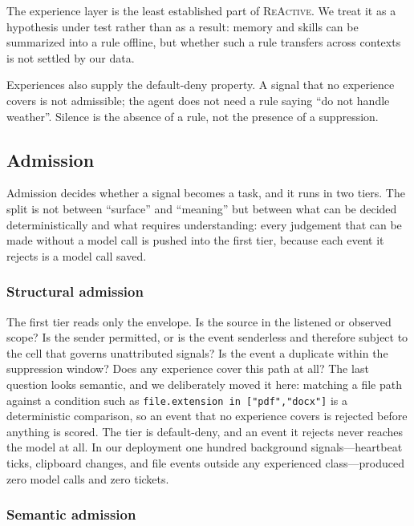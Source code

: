 \documentclass[10pt,a4paper]{article}
\newcommand{\sys}{\textsc{ReActive}}
\begin{document}
The experience layer is the least established part of \sys{}. We treat it as a hypothesis under test rather than as a result: memory and skills can be summarized into a rule offline, but whether such a rule transfers across contexts is not settled by our data.

Experiences also supply the default-deny property. A signal that no
experience covers is not admissible; the agent does not need a rule saying
``do not handle weather''. Silence is the absence of a rule, not the
presence of a suppression.

\subsection{Admission}

Admission decides whether a signal becomes a task, and it runs in two tiers. The split is not between ``surface'' and ``meaning'' but between what can be decided deterministically and what requires understanding: every judgement that can be made without a model call is pushed into the first tier, because each event it rejects is a model call saved.

\subsubsection{Structural admission}

The first tier reads only the envelope. Is the source in the listened or observed scope? Is the sender permitted, or is the event senderless and therefore subject to the cell that governs unattributed signals? Is the event a duplicate within the suppression window? Does any experience cover this path at all? The last question looks semantic, and we deliberately moved it here: matching a file path against a condition such as \texttt{file.extension in ["pdf","docx"]} is a deterministic comparison, so an event that no experience covers is rejected before anything is scored. The tier is default-deny, and an event it rejects never reaches the model at all. In our deployment one hundred background signals---heartbeat ticks, clipboard changes, and file events outside any experienced class---produced zero model calls and zero tickets.

\subsubsection{Semantic admission}
\end{document}
